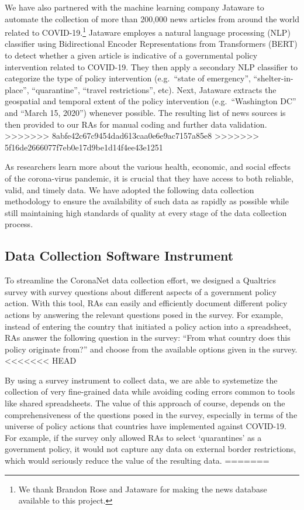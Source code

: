 \documentclass[]{article}
\let\rmarkdownfootnote\footnote%
\def\footnote{\protect\rmarkdownfootnote}
\begin{document}
We have also partnered with the machine learning company Jataware to automate the collection of more than 200,000 news articles from around the world related to COVID-19.\footnote{We thank Brandon Rose and Jataware for making the news database available to this project.} Jataware employes a natural language processing (NLP) classifier using Bidirectional Encoder Representations from Transformers (BERT) to detect whether a given article is indicative of a governmental policy intervention related to COVID-19. They then apply a secondary NLP classifier to categorize the type of policy intervention (e.g.~``state of emergency'', ``shelter-in-place'', ``quarantine'', ``travel restrictions'', etc). Next, Jataware extracts the geospatial and temporal extent of the policy intervention (e.g.~``Washington DC'' and ``March 15, 2020'') whenever possible. The resulting list of news sources is then provided to our RAs for manual coding and further data validation.
>>>>>>> 8abfe42c67c9454dad613caa0e6e9ac7157a85e8
>>>>>>> 5f16de2666077f7eb0e17d9be1d14f4ee43e1251

As researchers learn more about the various health, economic, and social effects of the corona-virus pandemic, it is crucial that they have access to both reliable, valid, and timely data. We have adopted the following data collection methodology to ensure the availability of such data as rapidly as possible while still maintaining high standards of quality at every stage of the data collection process.

\hypertarget{data-collection-software-instrument}{%
\subsection{Data Collection Software Instrument}\label{data-collection-software-instrument}}

To streamline the CoronaNet data collection effort, we designed a Qualtrics survey with survey questions about different aspects of a government policy action. With this tool, RAs can easily and efficiently document different policy actions by answering the relevant questions posed in the survey. For example, instead of entering the country that initiated a policy action into a spreadsheet, RAs answer the following question in the survey: ``From what country does this policy originate from?'' and choose from the available options given in the survey.
<<<<<<< HEAD

By using a survey instrument to collect data, we are able to systemetize the collection of very fine-grained data while avoiding coding errors common to tools like shared spreadsheets. The value of this approach of course, depends on the comprehensiveness of the questions posed in the survey, especially in terms of the universe of policy actions that countries have implemented against COVID-19. For example, if the survey only allowed RAs to select `quarantines' as a government policy, it would not capture any data on external border restrictions, which would seriously reduce the value of the resulting data.
=======
\end{document}
